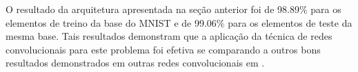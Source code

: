 \documentclass[
	12pt,				%
	oneside,			%
	a4paper,			%
	english,			%
	french,				%
	spanish,			%
	brazil,				%
	]{abntex2}
\begin{document}
\par O resultado da arquitetura apresentada na seção anterior foi de 98.89\% para os elementos de treino da base do MNIST e de 99.06\% para os elementos de teste da mesma base. Tais resultados demonstram que a aplicação da técnica de redes convolucionais para este problema foi efetiva se comparando a outros bons resultados demonstrados em outras redes convolucionais em .






%
%





\end{document}
